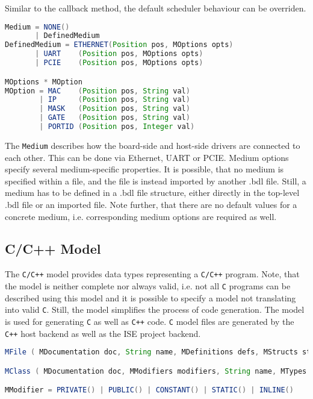 \documentclass{report}
\begin{document}
Similar to the callback method, the default scheduler behaviour can be overriden.

\begin{lstlisting}[language=java, breaklines=true]
Medium = NONE()
       | DefinedMedium
DefinedMedium = ETHERNET(Position pos, MOptions opts)
       | UART    (Position pos, MOptions opts)
       | PCIE    (Position pos, MOptions opts)

MOptions * MOption
MOption = MAC    (Position pos, String val)
        | IP     (Position pos, String val)
        | MASK   (Position pos, String val)
        | GATE   (Position pos, String val)
        | PORTID (Position pos, Integer val)
\end{lstlisting}

The \texttt{Medium} describes how the board-side and host-side drivers are connected to each other. This can be done via Ethernet, UART or PCIE. Medium options specify several medium-specific properties. It is possible, that no medium is specified within a file, and the file is instead imported by another .bdl file. Still, a medium has to be defined in a .bdl file structure, either directly in the top-level .bdl file or an imported file. Note further, that there are no default values for a concrete medium, i.e. corresponding medium options are required as well.

\subsection{C/C++ Model}
\label{sec:cmodel}
The \texttt{C/C++} model provides data types representing a \texttt{C/C++} program. Note, that the model is neither complete nor always valid, i.e. not all \texttt{C} programs can be described using this model and it is possible to specify a model not translating into valid \texttt{C}. Still, the model simplifies the process of code generation. The model is used for generating \texttt{C} as well as \texttt{C++} code. \texttt{C} model files are generated by the \texttt{C++} host backend as well as the ISE project backend.

\begin{lstlisting}[language=java, breaklines=true]
MFile ( MDocumentation doc, String name, MDefinitions defs, MStructs structs, MEnums enums, MAttributes attributes, MMethods methods, MClasses classes )

MClass ( MDocumentation doc, MModifiers modifiers, String name, MTypes extend, MStructs structs, MEnums enums, MAttributes attributes, MMethods methods, MClasses nested )

MModifier = PRIVATE() | PUBLIC() | CONSTANT() | STATIC() | INLINE()
\end{lstlisting}
\end{document}
